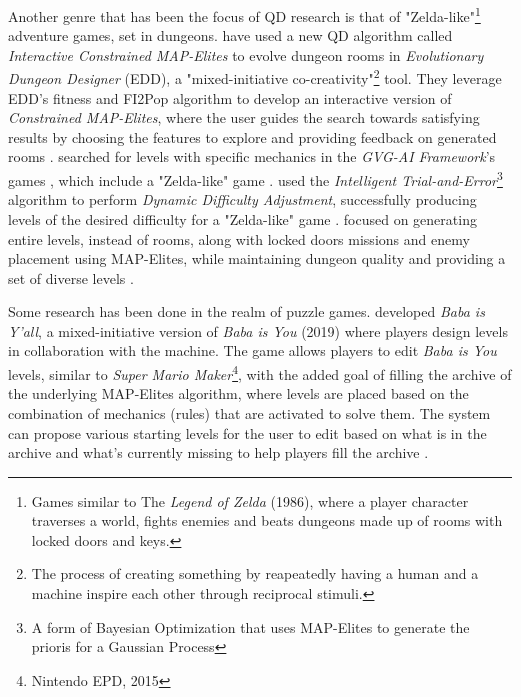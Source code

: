 \documentclass{Configuration_Files/PoliMi3i_thesis}
\begin{document}
Another genre that has been the focus of QD research is that of "Zelda-like"\footnote{Games similar to The \textit{Legend of Zelda} (1986), where a player character traverses a world, fights enemies and beats dungeons made up of rooms with locked doors and keys.} adventure games, set in dungeons. 
\citeauthor{alvarez_empowering_2019} have used a new QD algorithm called \textit{Interactive Constrained MAP-Elites} to evolve dungeon rooms in \textit{Evolutionary Dungeon Designer} (EDD), a "mixed-initiative co-creativity"\footnote{The process of creating something by reapeatedly having a human and a machine inspire each other through reciprocal stimuli.} tool. They leverage EDD's fitness and FI2Pop algorithm to develop an interactive version of \textit{Constrained MAP-Elites}, where the user guides the search towards satisfying results by choosing the features to explore and providing feedback on generated rooms \cite{alvarez_empowering_2019}. 
\citeauthor{charity_mech-elites_2020} searched for levels with specific mechanics in the \textit{GVG-AI Framework}'s games \cite{perez-liebana_general_2019}, which include a "Zelda-like" game \cite{charity_mech-elites_2020}. 
 used the \textit{Intelligent Trial-and-Error}\footnote{A form of Bayesian Optimization that uses MAP-Elites to generate the prioris for a Gaussian Process} algorithm to perform \textit{Dynamic Difficulty Adjustment}, successfully producing levels of the desired difficulty for a "Zelda-like" game \cite{gonzalez-duque_finding_2020}. \citeauthor{viana_illuminating_2022} focused on generating entire levels, instead of rooms, along with locked doors missions and enemy placement using MAP-Elites, while maintaining dungeon quality and providing a set of diverse levels \cite{viana_illuminating_2022}.

Some research has been done in the realm of puzzle games.  developed \textit{Baba is Y'all}, a mixed-initiative version of \textit{Baba is You} (2019) where players design levels in collaboration with the machine. The game allows players to edit \textit{Baba is You} levels, similar to \textit{Super Mario Maker}\footnote{Nintendo EPD, 2015}, with the added goal of filling the archive of the underlying MAP-Elites algorithm, where levels are placed based on the combination of mechanics (rules) that are activated to solve them. The system can propose various starting levels for the user to edit based on what is in the archive and what's currently missing to help players fill the archive \cite{charity_baba_2020}. 
\end{document}
